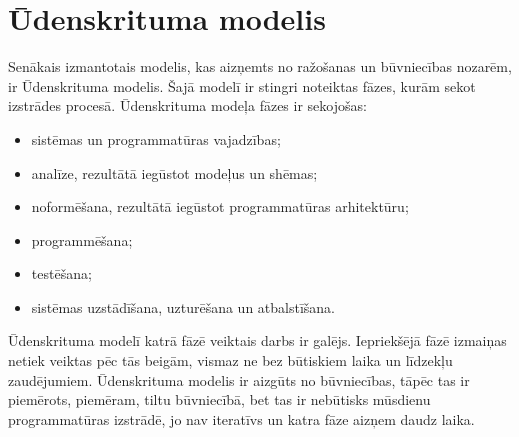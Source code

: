 \section{Ūdenskrituma modelis}
Senākais izmantotais modelis, kas aizņemts no ražošanas un būvniecības nozarēm, ir Ūdenskrituma modelis. Šajā modelī ir stingri noteiktas fāzes, kurām sekot izstrādes procesā.
Ūdenskrituma modeļa fāzes ir sekojošas:
\begin{itemize}
	\item sistēmas un programmatūras vajadzības;
	\item analīze, rezultātā iegūstot modeļus un shēmas;
	\item noformēšana, rezultātā iegūstot programmatūras arhitektūru;
	\item programmēšana;
	\item testēšana;
	\item sistēmas uzstādīšana, uzturēšana un atbalstīšana.
\end{itemize}
Ūdenskrituma modelī katrā fāzē veiktais darbs ir galējs. Iepriekšējā fāzē izmaiņas netiek veiktas pēc tās beigām, vismaz ne bez būtiskiem laika un līdzekļu zaudējumiem.
Ūdenskrituma modelis ir aizgūts no būvniecības, tāpēc tas ir piemērots, piemēram, tiltu būvniecībā, bet tas ir nebūtisks mūsdienu programmatūras izstrādē, jo nav iteratīvs un katra fāze aizņem daudz laika.


